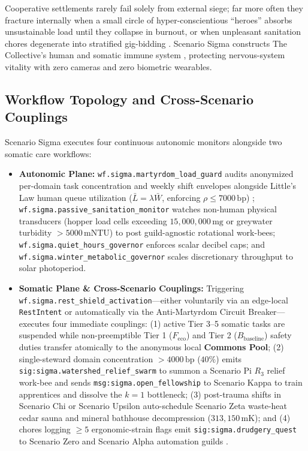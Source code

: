 Cooperative settlements rarely fail solely from external siege; far more often they fracture
internally when a small circle of hyper-conscientious ``heroes'' absorbs unsustainable load until
they collapse in burnout, or when unpleasant sanitation chores degenerate into stratified gig-bidding
\parencite{han2015,freeman1972}. Scenario Sigma constructs The Collective's human and somatic immune
system \parencite{cannon1932,ashby1956}, protecting nervous-system vitality with zero cameras and
zero biometric wearables.

\subsection{Workflow Topology and Cross-Scenario Couplings}

Scenario Sigma executes four continuous autonomic monitors alongside two somatic care workflows:
\begin{itemize}
    \item \textbf{Autonomic Plane:} \texttt{wf.sigma.martyrdom\_load\_guard} audits anonymized
    per-domain task concentration and weekly shift envelopes alongside Little's Law human queue
    utilization ($\bar{L} = \lambda \bar{W}$, enforcing $\rho \le 7000\,\mathrm{bp}$)
    \parencite{little1961proof}; \texttt{wf.sigma.passive\_sanitation\_monitor} watches non-human
    physical transducers (hopper load cells exceeding $15{,}000{,}000\,\mathrm{mg}$ or greywater
    turbidity $> 5000\,\mathrm{mNTU}$) to post guild-agnostic rotational work-bees;
    \texttt{wf.sigma.quiet\_hours\_governor} enforces scalar decibel caps; and
    \texttt{wf.sigma.winter\_metabolic\_governor} scales discretionary throughput to solar photoperiod.
    \item \textbf{Somatic Plane \& Cross-Scenario Couplings:} Triggering
    \texttt{wf.sigma.rest\_shield\_activation}---either voluntarily via an edge-local
    \texttt{RestIntent} or automatically via the Anti-Martyrdom Circuit Breaker---executes four
    immediate couplings: (1) active Tier 3--5 somatic tasks are suspended while non-preemptible
    Tier 1 ($F_{\mathrm{eco}}$) and Tier 2 ($B_{\mathrm{baseline}}$) safety duties transfer
    atomically to the anonymous local \textbf{Commons Pool}; (2) single-steward domain concentration
    $> 4000\,\mathrm{bp}$ ($40\%$) emits \texttt{sig:sigma.watershed\_relief\_swarm} to summon a
    Scenario Pi $R_3$ relief work-bee and sends \texttt{msg:sigma.open\_fellowship} to Scenario Kappa
    to train apprentices and dissolve the $k=1$ bottleneck; (3) post-trauma shifts in Scenario Chi or
    Scenario Upsilon auto-schedule Scenario Zeta waste-heat cedar sauna and mineral bathhouse
    decompression ($313{,}150\,\mathrm{mK}$); and (4) chores logging $\ge 5$ ergonomic-strain flags
    emit \texttt{sig:sigma.drudgery\_quest} to Scenario Zero and Scenario Alpha automation guilds
    \parencite{illich1973}.
\end{itemize}

